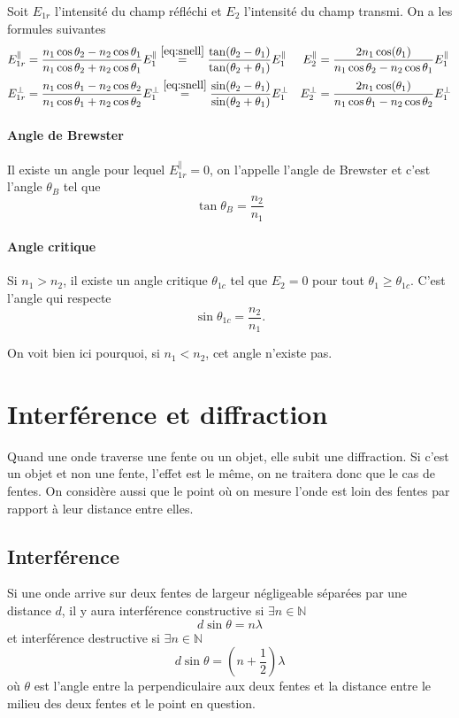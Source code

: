 Soit $E_{1r}$ l'intensité du champ réfléchi
et $E_{2}$ l'intensité du champ transmi.
On a les formules suivantes
\begin{align*}
  E_{1r}^\parallel & = \frac{n_1\cos\theta_2 - n_2\cos\theta_1}
  {n_1\cos\theta_2 + n_2\cos\theta_1}E_{1}^\parallel
  \stackrel{\eqref{eq:snell}}{=}
  \frac{\tan(\theta_2 - \theta_1)}{\tan(\theta_2 + \theta_1)}E_1^\parallel
  & E_2^\parallel & = \frac{2n_1\cos(\theta_1)}
  {n_1\cos\theta_2 - n_2\cos\theta_1}E_{1}^\parallel\\
  E_{1r}^\perp & = \frac{n_1\cos\theta_1 - n_2\cos\theta_2}
  {n_1\cos\theta_1 + n_2\cos\theta_2}E_{1}^\perp
  \stackrel{\eqref{eq:snell}}{=}
  \frac{\sin(\theta_2 - \theta_1)}{\sin(\theta_2 + \theta_1)}E_1^\perp
  & E_2^\perp & = \frac{2n_1\cos(\theta_1)}
  {n_1\cos\theta_1 - n_2\cos\theta_2}E_{1}^\perp\\
\end{align*}

\paragraph{Angle de Brewster}
Il existe un angle pour lequel $E_{1r}^\parallel = 0$,
on l'appelle l'angle de Brewster et c'est l'angle $\theta_B$ tel que
\[ \tan\theta_B = \frac{n_2}{n_1} \]

\paragraph{Angle critique}
Si $n_1 > n_2$, il existe un angle critique $\theta_{1c}$ tel que
$E_{2} = 0$ pour tout $\theta_1 \geq \theta_{1c}$.
C'est l'angle qui respecte
\[ \sin\theta_{1c} = \frac{n_2}{n_1}. \]

On voit bien ici pourquoi, si $n_1 < n_2$, cet angle n'existe pas.

\section{Interférence et diffraction}
Quand une onde traverse une fente ou un objet, elle subit une diffraction.
Si c'est un objet et non une fente, l'effet est le même,
on ne traitera donc que le cas de fentes.
On considère aussi que le point où on mesure l'onde est loin des fentes
par rapport à leur distance entre elles.

\subsection{Interférence}
Si une onde arrive sur deux fentes de largeur négligeable séparées par
une distance $d$,
il y aura interférence constructive si $\exists n \in \mathbb{N}$
\[ d\sin\theta = n \lambda \]
et interférence destructive si $\exists n \in \mathbb{N}$
\[ d\sin\theta = \left(n+\frac{1}{2}\right) \lambda \]
où $\theta$ est l'angle entre la perpendiculaire aux deux fentes et
la distance entre le milieu des deux fentes et le point en question.

